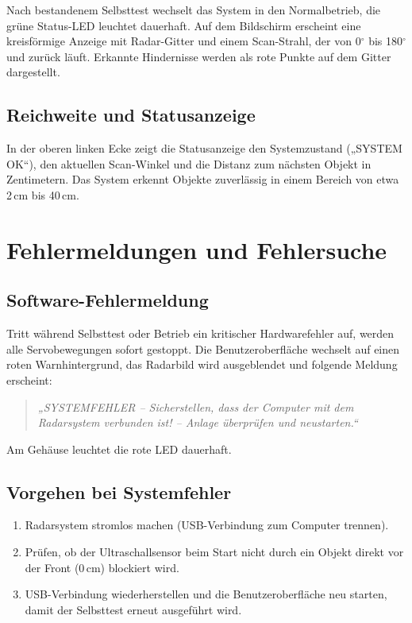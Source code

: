 \documentclass[a4paper,11pt]{article}
\begin{document}
	Nach bestandenem Selbsttest wechselt das System in den Normalbetrieb, die grüne Status-LED leuchtet dauerhaft. 
	Auf dem Bildschirm erscheint eine kreisförmige Anzeige mit Radar-Gitter und einem Scan-Strahl, der von 0\(^\circ\) bis 180\(^\circ\) und zurück läuft. 
	Erkannte Hindernisse werden als rote Punkte auf dem Gitter dargestellt. 
	
	\subsection{Reichweite und Statusanzeige}
	
	In der oberen linken Ecke zeigt die Statusanzeige den Systemzustand („SYSTEM OK“), den aktuellen Scan-Winkel und die Distanz zum nächsten Objekt in Zentimetern. 
	Das System erkennt Objekte zuverlässig in einem Bereich von etwa 2\,cm bis 40\,cm. 
	
	\section{Fehlermeldungen und Fehlersuche}
	
	\subsection{Software-Fehlermeldung}
	
	Tritt während Selbsttest oder Betrieb ein kritischer Hardwarefehler auf, werden alle Servobewegungen sofort gestoppt. 
	Die Benutzeroberfläche wechselt auf einen roten Warnhintergrund, das Radarbild wird ausgeblendet und folgende Meldung erscheint: 
	
	\begin{quote}
		\textit{„SYSTEMFEHLER – Sicherstellen, dass der Computer mit dem Radarsystem verbunden ist! – Anlage überprüfen und neustarten.“}
	\end{quote}
	
	Am Gehäuse leuchtet die rote LED dauerhaft. 
	
	\subsection{Vorgehen bei Systemfehler}
	
	\begin{enumerate}
		\item Radarsystem stromlos machen (USB-Verbindung zum Computer trennen). 
		\item Prüfen, ob der Ultraschallsensor beim Start nicht durch ein Objekt direkt vor der Front (0\,cm) blockiert wird. 
		\item USB-Verbindung wiederherstellen und die Benutzeroberfläche neu starten, damit der Selbsttest erneut ausgeführt wird. 
	\end{enumerate}
	
\end{document}
